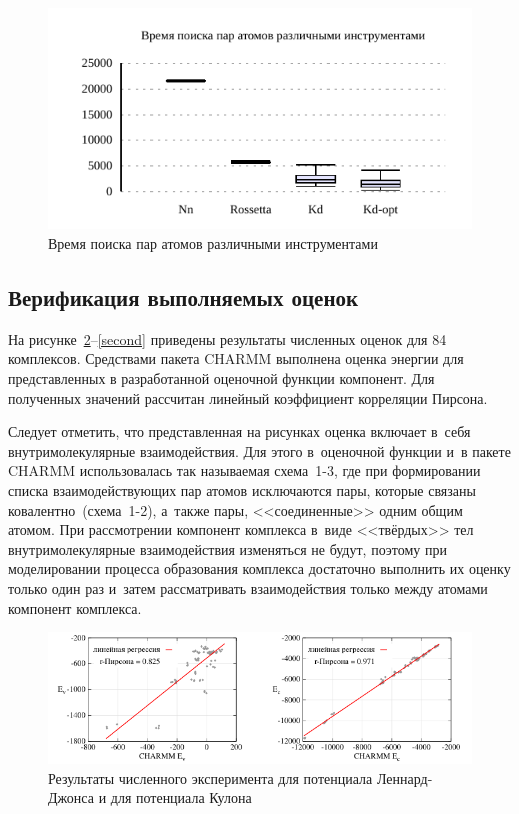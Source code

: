\begin{figure}[ht!]
	\centering
	\includegraphics[width=1.0\linewidth]{images/plotsvg.pdf}
	\caption{Время поиска пар атомов различными инструментами}
	\label{all_instr}
\end{figure}


\subsection{Верификация выполняемых оценок}


На рисунке~\ref{first}--\ref{second} приведены результаты численных оценок для 84 комплексов. Средствами пакета CHARMM выполнена оценка энергии для представленных в разработанной оценочной функции компонент. Для полученных значений рассчитан линейный коэффициент корреляции Пирсона.

Следует отметить, что представленная на рисунках оценка включает в~себя внутримолекулярные взаимодействия. Для этого в~оценочной функции и~в пакете CHARMM использовалась так называемая схема~1-3, где при формировании списка взаимодействующих пар атомов исключаются пары, которые связаны ковалентно~(схема~1-2), а~также пары, <<соединенные>> одним общим атомом. При рассмотрении компонент комплекса в~виде <<твёрдых>> тел внутримолекулярные взаимодействия изменяться не будут, поэтому при моделировании процесса образования комплекса достаточно выполнить их оценку только один раз и~затем рассматривать взаимодействия только между атомами компонент комплекса.

\begin{figure}[h!]
	\centering
	\includegraphics[width=1.0\linewidth]{images/first.pdf}
	\caption{Результаты численного эксперимента для потенциала Леннард-Джонса и для потенциала Кулона}
	\label{first}
\end{figure}

